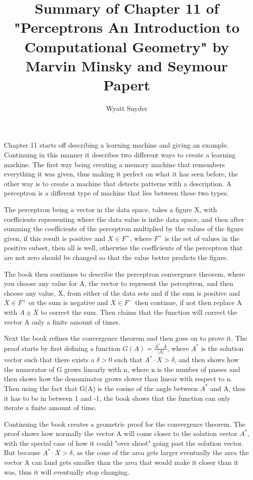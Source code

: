 \documentclass{article}
\author{Wyatt Snyder}
\title{Summary of Chapter 11 of "Perceptrons An Introduction to Computational Geometry" by Marvin Minsky and Seymour Papert}
\begin{document}
	\maketitle
	Chapter 11 starts off describing a learning machine and giving an example.
	Continuing in this manner it describes two different ways to create a learning machine. 
	The first way being creating a memory machine that remembers everything
	it was given, thus making it perfect on what it has seen before, the other way
	is to create a machine that detects patterns with a description. A perceptron is a
	different type of machine that lies between these two types.
	
	The perceptron being a vector in the data space, takes a figure X, with coefficients 
	representing where the data value is inthe data space, and then after summing the 
	coefficients of the perceptron multiplied by the values of the figure given, if this 
	result is positive and $X\in F^+$, where $F^+$ is the set of values in the positive subset,
	then all is well, otherwise the coefficients of the perceptron that are not zero should be 
	changed so that the value better predicts the figure.
	
	The book then continues to describe the perceptron convergence theorem, where you choose
	any value for A, the vector to represent the perceptron, and then choose any value, X, from
	either of the data sets and if the sum is positive and $X\in F^+$ or the sum is negative and
	$X\in F^-$ then continue, if not then replace A
	with $A\pm X$ to correct the sum. Then claims that the function will correct the
	vector A only a finite amount of times.
	
	Next the book refines the convergence theorem and then goes on to prove it. The proof
	starts by first defining a function $G(A)=\frac{A^* \cdot A}{|A|}$, where $A^*$ is the
	solution vector such that there exists a $\delta > 0$ such that $A^* \cdot X > \delta$, 
	and then shows how the numerator of G grows linearly with n, where n is the number of passes
	and then shows how the denominator grows slower
	than linear with respect to n. Then using the fact that G(A) is the cosine of the angle between $A^*$ and A,
	thus it has to be in between 1 and -1, the book shows that the function can only iterate a finite 
	amount of time.
	
	Continuing the book creates a geometric proof for the convergence theorem. The proof shows
	how normally the vector A will come closer to the solution vector $A^*$, with the special
	case of how it could "over shoot" going past the solution vector. But because
	$A^* \cdot X > \delta$, as the cone of the area gets larger eventually the area the vector A
	can land gets smaller than the area that would make it closer than it was, thus it will 
	eventually stop changing.
	
\end{document}

